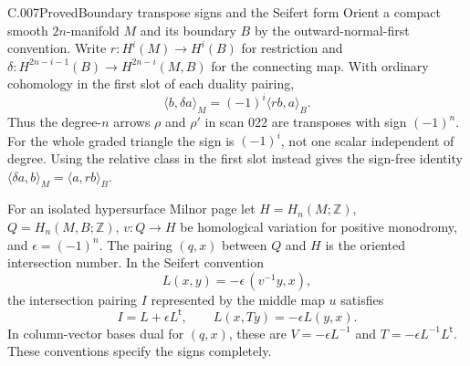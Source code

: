 \begin{saresult}{C.007}{Proved}{Boundary transpose signs and the Seifert form}
Orient a compact smooth $2n$-manifold $M$ and its boundary $B$ by the
outward-normal-first convention. Write $r:H^i(M)\to H^i(B)$ for
restriction and $\delta:H^{2n-i-1}(B)\to H^{2n-i}(M,B)$ for the
connecting map. With ordinary cohomology in the first slot of each
duality pairing,
\[
 \langle b,\delta a\rangle_M
       =(-1)^i\langle rb,a\rangle_B.
 \tag{C.7.1}
\]
Thus the degree-$n$ arrows $\rho$ and $\rho'$ in scan 022 are transposes
with sign $(-1)^n$. For the whole graded triangle the sign is $(-1)^i$,
not one scalar independent of degree. Using the relative class in the
first slot instead gives the sign-free identity
$\langle\delta a,b\rangle_M=\langle a,rb\rangle_B$.

For an isolated hypersurface Milnor page let $H=H_n(M;\mathbb Z)$,
$Q=H_n(M,B;\mathbb Z)$, $v:Q\to H$ be homological variation for
positive monodromy, and $\epsilon=(-1)^n$. The pairing $(q,x)$ between
$Q$ and $H$ is the oriented intersection number. In the Seifert convention
\[
 L(x,y)=-\epsilon\,(v^{-1}y,x),
 \tag{C.7.2}
\]
the intersection pairing $I$ represented by the middle map $u$ satisfies
\[
 I=L+\epsilon L^{\mathsf t},\qquad
 L(x,Ty)=-\epsilon L(y,x).
 \tag{C.7.3}
\]
In column-vector bases dual for $(q,x)$, these are
$V=-\epsilon L^{-1}$ and $T=-\epsilon L^{-1}L^{\mathsf t}$.
These conventions specify the signs completely.
\end{saresult}
